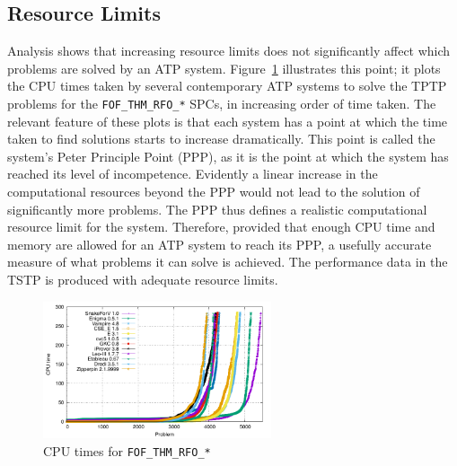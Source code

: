 \documentclass[runningheads]{llncs}
\begin{document}
\subsection{Resource Limits}
\label{ResourceLimits}

Analysis shows that increasing resource limits does not significantly affect which problems 
are solved by an ATP system. 
Figure~\ref{PPPPlot} illustrates this point; it plots the CPU times taken by several contemporary 
ATP systems to solve the TPTP problems for the {\tt FOF\_THM\_RFO\_*} SPCs, in increasing order 
of time taken. 
The relevant feature of these plots is that each system has a point at which the time taken to 
find solutions starts to increase dramatically. 
This point is called the system's Peter Principle \cite{PH69} Point (PPP), as it is the point at 
which the system has reached its level of incompetence. 
Evidently a linear increase in the computational resources beyond the PPP would not lead to the 
solution of significantly more problems. 
The PPP thus defines a realistic computational resource limit for the system. 
Therefore, provided that enough CPU time and memory are allowed for an ATP system to reach its 
PPP, a usefully accurate measure of what problems it can solve is achieved.
The performance data in the TSTP is produced with adequate resource limits.

\begin{figure}[t!]
\centering
\includegraphics[width=0.6\textwidth]{Plots/FOF_THM_RFO_PPP/FOF_THM_RFO_PPP}
\vspace*{-1em}
\caption{CPU times for {\tt FOF\_THM\_RFO\_*}}
\label{PPPPlot}
\end{figure}
\end{document}
